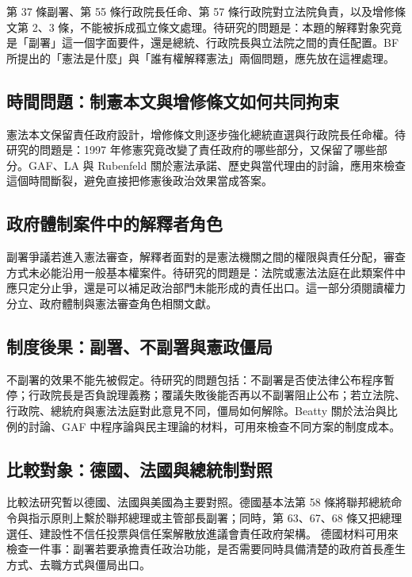\documentclass[12pt]{ctexart}
\begin{document}
第 37 條副署、第 55 條行政院長任命、第 57 條行政院對立法院負責，以及增修條文第 2、3 條，不能被拆成孤立條文處理。待研究的問題是：本題的解釋對象究竟是「副署」這一個字面要件，還是總統、行政院長與立法院之間的責任配置。BF 所提出的「憲法是什麼」與「誰有權解釋憲法」兩個問題，應先放在這裡處理。

\subsection{時間問題：制憲本文與增修條文如何共同拘束}

憲法本文保留責任政府設計，增修條文則逐步強化總統直選與行政院長任命權。待研究的問題是：1997 年修憲究竟改變了責任政府的哪些部分，又保留了哪些部分。GAF、LA 與 Rubenfeld 關於憲法承諾、歷史與當代理由的討論，應用來檢查這個時間斷裂，避免直接把修憲後政治效果當成答案。

\subsection{政府體制案件中的解釋者角色}

副署爭議若進入憲法審查，解釋者面對的是憲法機關之間的權限與責任分配，審查方式未必能沿用一般基本權案件。待研究的問題是：法院或憲法法庭在此類案件中應只定分止爭，還是可以補足政治部門未能形成的責任出口。這一部分須閱讀權力分立、政府體制與憲法審查角色相關文獻。

\subsection{制度後果：副署、不副署與憲政僵局}

不副署的效果不能先被假定。待研究的問題包括：不副署是否使法律公布程序暫停；行政院長是否負說理義務；覆議失敗後能否再以不副署阻止公布；若立法院、行政院、總統府與憲法法庭對此意見不同，僵局如何解除。Beatty 關於法治與比例的討論、GAF 中程序論與民主理論的材料，可用來檢查不同方案的制度成本。

\subsection{比較對象：德國、法國與總統制對照}

比較法研究暫以德國、法國與美國為主要對照。德國基本法第 58 條將聯邦總統命令與指示原則上繫於聯邦總理或主管部長副署；同時，第 63、67、68 條又把總理選任、建設性不信任投票與信任案解散放進議會責任政府架構。\autocite{germany_basic_law} 德國材料可用來檢查一件事：副署若要承擔責任政治功能，是否需要同時具備清楚的政府首長產生方式、去職方式與僵局出口。
\end{document}
